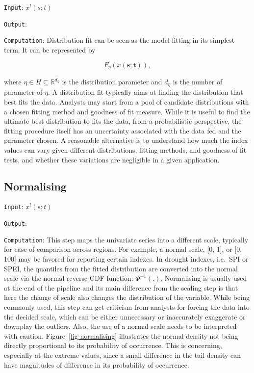 \documentclass[
]{interact}
\begin{document}
\texttt{Input}: \(x^l(s; t)\)

\texttt{Output}:

\texttt{Computation}: Distribution fit can be seen as the model fitting
in its simplest term. It can be represented by

\begin{equation}
F_{\eta}(x(\mathbf{s}; \mathbf{t})), 
\end{equation}

where \(\eta \in H \subseteq \mathbb{R}^{d_{\eta}}\) is the distribution
parameter and \(d_{\eta}\) is the number of parameter of \(\eta\). A
distribution fit typically aims at finding the distribution that best
fits the data. Analysts may start from a pool of candidate distributions
with a chosen fitting method and goodness of fit measure. While it is
useful to find the ultimate best distribution to fits the data, from a
probabilistic perspective, the fitting procedure itself has an
uncertainty associated with the data fed and the parameter chosen. A
reasonable alternative is to understand how much the index values can
vary given different distributions, fitting methods, and goodness of fit
tests, and whether these variations are negligible in a given
application.

\hypertarget{normalising}{%
\subsection{Normalising}\label{normalising}}

\texttt{Input}: \(x^l(s; t)\)

\texttt{Output}:

\texttt{Computation}: This step maps the univariate series into a
different scale, typically for ease of comparison across regions. For
example, a normal scale, {[}0, 1{]}, or {[}0, 100{]} may be favored for
reporting certain indexes. In drought indexes, i.e.~SPI or SPEI, the
quantiles from the fitted distribution are converted into the normal
scale via the normal reverse CDF function: \(\Phi^{-1}(.)\). Normalising
is usually used at the end of the pipeline and its main difference from
the scaling step is that here the change of scale also changes the
distribution of the variable. While being commonly used, this step can
get criticism from analysts for forcing the data into the decided scale,
which can be either unnecessary or inaccurately exaggerate or downplay
the outliers. Also, the use of a normal scale needs to be interpreted
with caution. Figure~\ref{fig-normalising} illustrates the normal
density not being directly proportional to its probability of
occurrence. This is concerning, especially at the extreme values, since
a small difference in the tail density can have magnitudes of difference
in its probability of occurrence.
\end{document}

